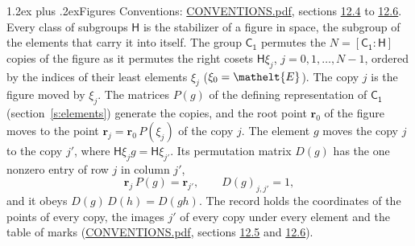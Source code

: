 \documentclass[10pt,a4paper]{article}
\makeatletter
\renewcommand\section{\@startsection{section}{1}{\z@}{-3ex plus -1ex minus -.2ex}%
  {1.2ex plus .2ex}{\normalfont\large\sffamily\bfseries\color{parttitle}}}
\numberwithin{equation}{section}
\newcommand{\eltfont}[1]{{\let\sigma\eltsigma\mathelt{#1}}}
\newcommand{\grp}[1]{\mathsf{#1}}
\newcommand{\cls}[1]{\eltfont{#1}}
\newcommand{\pointr}{\mathbf{r}}
\makeatother
\begin{document}
\section{Figures}\label{s:permutation}
Conventions: \href{../../CONVENTIONS.pdf}{CONVENTIONS.pdf}, sections \href{../../CONVENTIONS.pdf\#conv.12.4}{12.4} to \href{../../CONVENTIONS.pdf\#conv.12.6}{12.6}.
Every class of subgroups $\grp{H}$ is the stabilizer of a figure in space, the subgroup of the elements that carry it into itself. \label{n:local.orbit.size}\label{n:element.coset.least}\label{n:index.coset}The group $\grp{C_{1}}$ permutes the $N = [\grp{C_{1}} : \grp{H}]$ copies of the figure as it permutes the right cosets $\grp{H}\xi_j$, $j = 0, 1, \dots, N - 1$, ordered by the indices of their least elements $\xi_j$ ($\xi_0 = \cls{E}$). The copy $j$ is the figure moved by $\xi_j$. The matrices $P(g)$ of the defining representation of $\grp{C_{1}}$ (section~\ref{s:elements}) generate the copies, and the root point $\pointr_0$ of the figure moves to the point $\pointr_j = \pointr_0\, P(\xi_j)$ of the copy $j$. \label{n:local.coset.image}The element $g$ moves the copy $j$ to the copy $j'$, where $\grp{H}\xi_j g = \grp{H}\xi_{j'}$. \label{n:local.matrix.permutation}Its permutation matrix $D(g)$ has the one nonzero entry of row $j$ in column $j'$,
\begin{equation}\label{e:perm.matrix}\pointr_j\, P(g) = \pointr_{j'}, \qquad D(g)_{j,j'} = 1,\end{equation}
and it obeys $D(g)\, D(h) = D(gh)$. The record holds the coordinates of the points of every copy, the images $j'$ of every copy under every element and the table of marks (\href{../../CONVENTIONS.pdf}{CONVENTIONS.pdf}, sections \href{../../CONVENTIONS.pdf\#conv.12.5}{12.5} and \href{../../CONVENTIONS.pdf\#conv.12.6}{12.6}).
\end{document}
